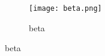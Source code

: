 \begin{figure}[h]
    \begin{subfigure}{0.5\textwidth}
        \texttt{[image: beta.png]}
        \caption{beta}
    \end{subfigure}
\end{figure}